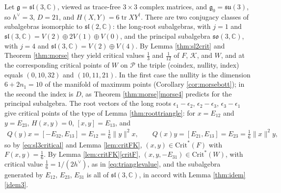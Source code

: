 \documentclass[leqno,10pt]{amsart}
\theoremstyle{definition}
\numberwithin{equation}{section}
\newcommand{\sect}{\mathscr{K}}
\newcommand{\so}{\mathfrak{so}}
\newcommand{\ep}{\epsilon}
\newcommand{\su}{\mathfrak{su}}
\newcommand{\sll}{\mathfrak{sl}}
\newcommand{\g}{\mathfrak{g}}
\newcommand{\com}{\mathbb C}
\newcommand{\tr}{\operatorname{tr}}
\newcommand{\crtnt}{\mathrm{Crit}^*}
\newcommand{\hv}{h^\vee}
\newcommand{\norm}[1]{\lVert #1\rVert}
\newcommand{\qad}{Q}
\begin{document}
\begin{example}\label{ex:sl3}
Let $\g = \sll(3, \com)$, viewed as trace-free $3\times 3$ complex matrices, and $\g_{0} = \su(3)$, so $\hv = 3$, $D = 21$, and $H(X, Y) = 6\tr XY^{\dagger}$. There are two conjugacy classes of subalgebras isomorphic to $\sll(2, \com)$: the long-root subalgebras, with $j = 1$ and $\sll(3, \com) = V(2) \oplus 2V(1) \oplus V(0)$, and the principal subalgebra $\so(3, \com)$, with $j = 4$ and $\sll(3, \com) = V(2) \oplus V(4)$. By Lemma \ref{thm:sl2crit} and Theorem \ref{thm:morse} they yield critical values $\tfrac{1}{3}$ and $\tfrac{1}{12}$ of $F$, $\sect$, and $W$, and at the corresponding critical points of $W$ on $\mathcal{P}$ the triple (coindex, nullity, index) equals $(0, 10, 32)$ and $(10, 11, 21)$. In the first case the nullity is the dimension $6 + 2n_{1} = 10$ of the manifold of maximum points (Corollary \ref{cor:morsebott}); in the second the index is $D$, as Theorem \ref{thm:morse}\ref{morse4} predicts for the principal subalgebra. The root vectors of the long roots $\ep_{1} - \ep_{2}$, $\ep_{2} - \ep_{3}$, $\ep_{3} - \ep_{1}$ give critical points of the type of Lemma \ref{thm:roottriangle}: for $x = E_{12}$ and $y = E_{23}$, $H(x, y) = 0$, $[x, y] = E_{13}$, and
\begin{align}\label{eq:sl3critical}
\qad(y)x = [-E_{32}, E_{13}] = E_{12} = \tfrac{1}{6}\norm{y}^{2}x, \qquad \qad(x)y = [E_{21}, E_{13}] = E_{23} = \tfrac{1}{6}\norm{x}^{2}y,
\end{align}
so by \eqref{eq:sl3critical} and Lemma \ref{lem:critFK}, $(x, y) \in \crtnt(F)$ with $F(x, y) = \tfrac{1}{6}$. By Lemma \ref{lem:critFK}\ref{critF}, $(x, y, -E_{31}) \in \crtnt(W)$, with critical value $\tfrac{1}{6} = 1/(2\hv)$, as in \eqref{eq:trianglevalue}, and the subalgebra generated by $E_{12}$, $E_{23}$, $E_{31}$ is all of $\sll(3, \com)$, in accord with Lemma \ref{thm:idem}\ref{idem3}.
\end{example}
\end{document}
